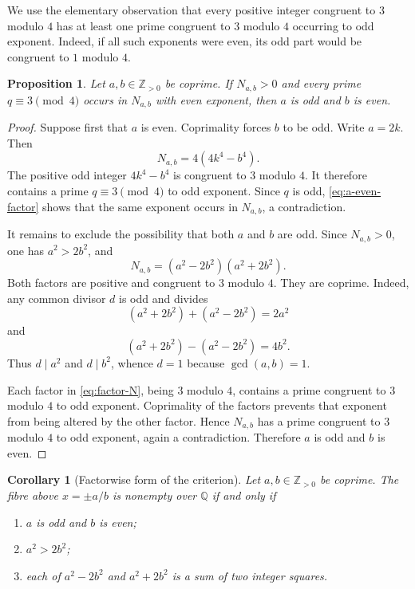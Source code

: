 \documentclass[11pt]{article}
\numberwithin{equation}{section}
\newtheorem{proposition}[theorem]{Proposition}
\newtheorem{corollary}[theorem]{Corollary}
\theoremstyle{definition}
\theoremstyle{remark}
\newcommand{\Q}{\mathbb{Q}}
\newcommand{\Z}{\mathbb{Z}}
\begin{document}
We use the elementary observation that every positive integer
congruent to $3$ modulo $4$ has at least one prime congruent to $3$
modulo $4$ occurring to odd exponent.  Indeed, if all such exponents
were even, its odd part would be congruent to $1$ modulo $4$.

\begin{proposition}\label{prop:parity}
Let $a,b\in\Z_{>0}$ be coprime.  If $N_{a,b}>0$ and every prime
$q\equiv3\pmod4$ occurs in $N_{a,b}$ with even exponent, then $a$ is odd
and $b$ is even.
\end{proposition}

\begin{proof}
Suppose first that $a$ is even.  Coprimality forces $b$ to be odd.  Write
$a=2k$.  Then
\begin{equation}\label{eq:a-even-factor}
 N_{a,b}=4(4k^{4}-b^{4}).
\end{equation}
The positive odd integer $4k^{4}-b^{4}$ is congruent to $3$ modulo $4$.
It therefore contains a prime $q\equiv3\pmod4$ to odd exponent.  Since
$q$ is odd, \eqref{eq:a-even-factor} shows that the same exponent occurs
in $N_{a,b}$, a contradiction.

It remains to exclude the possibility that both $a$ and $b$ are odd.
Since $N_{a,b}>0$, one has $a^{2}>2b^{2}$, and
\begin{equation}\label{eq:factor-N}
 N_{a,b}=(a^{2}-2b^{2})(a^{2}+2b^{2}).
\end{equation}
Both factors are positive and congruent to $3$ modulo $4$.  They are
coprime.  Indeed, any common divisor $d$ is odd and divides
\[
 (a^{2}+2b^{2})+(a^{2}-2b^{2})=2a^{2}
\]
and
\[
 (a^{2}+2b^{2})-(a^{2}-2b^{2})=4b^{2}.
\]
Thus $d\mid a^{2}$ and $d\mid b^{2}$, whence $d=1$ because
$\gcd(a,b)=1$.

Each factor in \eqref{eq:factor-N}, being $3$ modulo $4$, contains a
prime congruent to $3$ modulo $4$ to odd exponent.  Coprimality of the
factors prevents that exponent from being altered by the other factor.
Hence $N_{a,b}$ has a prime congruent to $3$ modulo $4$ to odd exponent,
again a contradiction.  Therefore $a$ is odd and $b$ is even.
\end{proof}

\begin{corollary}[Factorwise form of the criterion]\label{cor:factorwise}
Let $a,b\in\Z_{>0}$ be coprime.  The fibre above $x=\pm a/b$ is nonempty
over $\Q$ if and only if
\begin{enumerate}[label=\textup{(\alph*)},leftmargin=2.5em]
 \item $a$ is odd and $b$ is even;
 \item $a^{2}>2b^{2}$;
 \item each of $a^{2}-2b^{2}$ and $a^{2}+2b^{2}$ is a sum of two
 integer squares.
\end{enumerate}
\end{corollary}
\end{document}
